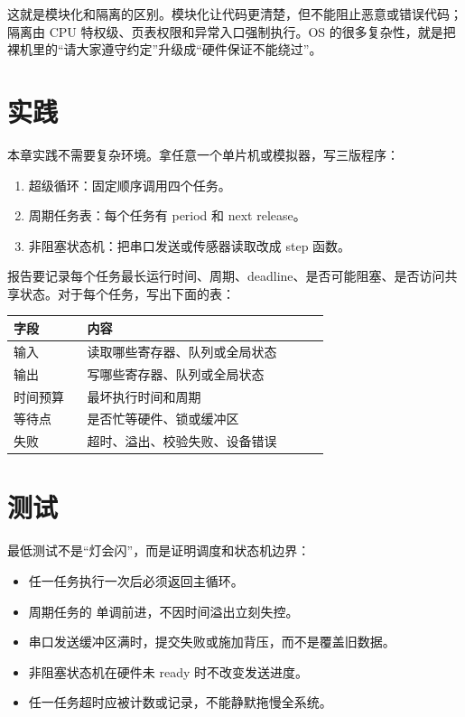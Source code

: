 这就是模块化和隔离的区别。模块化让代码更清楚，但不能阻止恶意或错误代码；隔离由 CPU 特权级、页表权限和异常入口强制执行。OS 的很多复杂性，就是把裸机里的“请大家遵守约定”升级成“硬件保证不能绕过”。

\section{实践}

本章实践不需要复杂环境。拿任意一个单片机或模拟器，写三版程序：

\begin{enumerate}
\tightlist
\item 超级循环：固定顺序调用四个任务。
\item 周期任务表：每个任务有 period 和 next release。
\item 非阻塞状态机：把串口发送或传感器读取改成 step 函数。
\end{enumerate}

报告要记录每个任务最长运行时间、周期、deadline、是否可能阻塞、是否访问共享状态。对于每个任务，写出下面的表：

\begin{longtable}{p{0.2\linewidth}p{0.66\linewidth}}
\toprule
字段 & 内容 \\
\midrule
输入 & 读取哪些寄存器、队列或全局状态 \\
输出 & 写哪些寄存器、队列或全局状态 \\
时间预算 & 最坏执行时间和周期 \\
等待点 & 是否忙等硬件、锁或缓冲区 \\
失败 & 超时、溢出、校验失败、设备错误 \\
\bottomrule
\end{longtable}

\section{测试}

最低测试不是“灯会闪”，而是证明调度和状态机边界：

\begin{itemize}
\tightlist
\item 任一任务执行一次后必须返回主循环。
\item 周期任务的  单调前进，不因时间溢出立刻失控。
\item 串口发送缓冲区满时，提交失败或施加背压，而不是覆盖旧数据。
\item 非阻塞状态机在硬件未 ready 时不改变发送进度。
\item 任一任务超时应被计数或记录，不能静默拖慢全系统。
\end{itemize}

